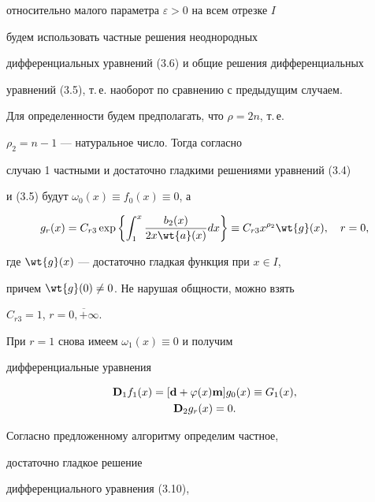 относительно малого параметра $ \varepsilon > 0$ на всем отрезке $I$


будем использовать частные решения неоднородных


дифференциальных уравнений (3.6) и общие решения дифференциальных


уравнений (3.5), т.\,е. наоборот по сравнению с предыдущим случаем.





Для определенности будем предполагать, что $\rho = 2n$, т.\,е.


$\rho_2 = n - 1$ --- натуральное число. Тогда согласно 


случаю 1 частными и достаточно гладкими решениями уравнений (3.4)


и (3.5) будут $\omega _0 (x) \equiv f_0 (x) \equiv 0$, а


\begin{equation}


g_r (x) = C_{r3} \exp \left\{ \int_1^x \frac{b_2 (x)}{2 x


\wt{a } (x)}d x \right\} \equiv C_{r3} x^{\rho_2} \wt{g}


(x), \quad r=0,


\end{equation}


где $\wt{g} (x)$ --- достаточно гладкая функция при $x \in I$,


причем $\wt{g} (0) \neq 0$. Не нарушая общности, можно взять


$C_{r3} = 1$, $r = \overline{0, +\infty}$.





При $r = 1$ снова имеем $\omega_1 (x) \equiv 0$ и получим


дифференциальные уравнения


\begin{gather}


\bold{D}_1 f_{1} (x) = [ \bold{d} + \f (x) \bold{m}] g_{0}


(x) \equiv G_1 (x), \\


\bold{D}_2 g_{r} (x) = 0.


\end{gather}


Согласно предложенному алгоритму определим частное, 


достаточно гладкое решение


дифференциального уравнения (3.10), 


